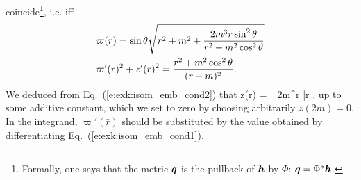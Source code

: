 coincide\footnote{Formally, one says that the metric $\bm{q}$ is the pullback
of $\bm{h}$ by $\Phi$: $\bm{q} = \Phi^* \bm{h}$.}, i.e. iff
\begin{subequations}
\begin{align}
    & \varpi(r) = \sin\theta \sqrt{r^2 + m^2 + \frac{2 m^3 r \sin^2\theta}{r^2 + m^2\cos^2\theta} }
        \label{e:exk:isom_emb_cond1} \\
    &\varpi'(r)^2 + z'(r)^2 = \frac{r^2 + m^2\cos^2\theta}{(r-m)^2}  . \label{e:exk:isom_emb_cond2}
\end{align}
\end{subequations}
We deduced from Eq.~(\ref{e:exk:isom_emb_cond2}) that
\be \label{e:exk:isom_emb_z_r}
    z(r) = \int_{2m}^r
     \; \D \bar{r} ,
\ee
up to some additive constant, which we set to zero by choosing arbitrarily $z(2m) = 0$.
In the integrand, $\varpi'(\bar{r})$ should be substituted by the value obtained
by differentiating Eq.~(\ref{e:exk:isom_emb_cond1}).

